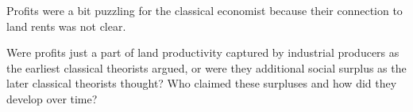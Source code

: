 Profits were a bit puzzling for the classical economist because their connection to land rents was not clear. 

Were profits just a part of land productivity captured by industrial producers as the earliest classical theorists argued, or were they  additional social surplus as the later classical theorists thought? Who claimed these surpluses and how did they develop over time? %







